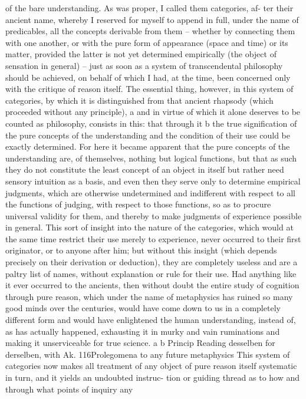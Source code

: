 of the bare understanding. As was proper, I called them categories, af-
ter their ancient name, whereby I reserved for myself to append in full,
under the name of predicables, all the concepts derivable from them –
whether by connecting them with one another, or with the pure form of
appearance (space and time) or its matter, provided the latter is not yet
determined empirically (the object of sensation in general) – just as soon
as a system of transcendental philosophy should be achieved, on behalf of
which I had, at the time, been concerned only with the critique of reason
itself.
The essential thing, however, in this system of categories, by which
it is distinguished from that ancient rhapsody (which proceeded without
any principle), a and in virtue of which it alone deserves to be counted
as philosophy, consists in this: that through it b the true signiﬁcation of
the pure concepts of the understanding and the condition of their use
could be exactly determined. For here it became apparent that the pure
concepts of the understanding are, of themselves, nothing but logical
functions, but that as such they do not constitute the least concept of an
object in itself but rather need sensory intuition as a basis, and even then
they serve only to determine empirical judgments, which are otherwise
undetermined and indifferent with respect to all the functions of judging,
with respect to those functions, so as to procure universal validity for
them, and thereby to make judgments of experience possible in general.
This sort of insight into the nature of the categories, which would
at the same time restrict their use merely to experience, never occurred
to their ﬁrst originator, or to anyone after him; but without this insight
(which depends precisely on their derivation or deduction), they are
completely useless and are a paltry list of names, without explanation
or rule for their use. Had anything like it ever occurred to the ancients,
then without doubt the entire study of cognition through pure reason,
which under the name of metaphysics has ruined so many good minds
over the centuries, would have come down to us in a completely different
form and would have enlightened the human understanding, instead of,
as has actually happened, exhausting it in murky and vain ruminations
and making it unserviceable for true science.
a
b
Princip
Reading desselben for derselben, with Ak.
116Prolegomena to any future metaphysics
This system of categories now makes all treatment of any object of
pure reason itself systematic in turn, and it yields an undoubted instruc-
tion or guiding thread as to how and through what points of inquiry any
